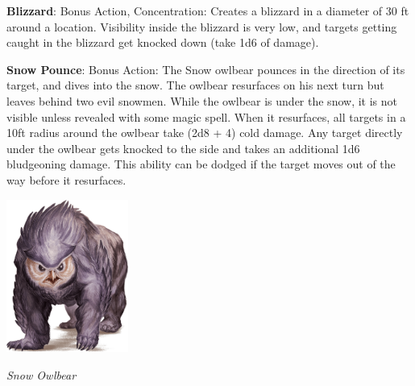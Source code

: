 \noindent\textbf{Blizzard}: Bonus Action, Concentration: Creates a blizzard in a diameter of 30 ft around a location. Visibility inside the blizzard is very low, and targets getting caught in the blizzard get knocked down (take 1d6 of damage).

\noindent\textbf{Snow Pounce}: Bonus Action: The Snow owlbear pounces in the direction of its target, and dives into the snow. The owlbear resurfaces on his next turn but leaves behind two evil snowmen. While the owlbear is under the snow, it is not visible unless revealed with some magic spell. When it resurfaces, all targets in a 10ft radius around the owlbear take (2d8 + 4) cold damage. Any target directly under the owlbear gets knocked to the side and takes an additional 1d6 bludgeoning damage. This ability can be dodged if the target moves out of the way before it resurfaces.

\begin{center}
	\includegraphics[width = 0.3\textwidth]{owlbear}
	
	\emph{Snow Owlbear}
\end{center}